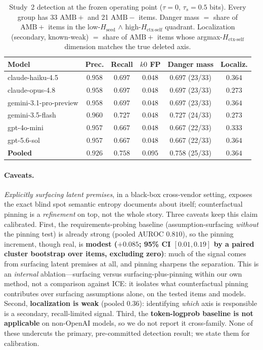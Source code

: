 \documentclass[acmsmall,screen,review,anonymous]{acmart}
\newcommand{\Hseed}{\ensuremath{H_{\mathrm{seed}}}}
\newcommand{\Hctx}{\ensuremath{H_{\text{ctx-self}}}}
\begin{document}
\begin{table}[t]
\centering
\caption{Study~2 detection at the frozen operating point ($\tau=0$, $\tau_s=0.5$ bits). Every group has
33 $\mathrm{AMB}{+}$ and 21 $\mathrm{AMB}{-}$ items. Danger mass $=$ share of $\mathrm{AMB}{+}$ items in the
low-\Hseed{} $\wedge$ high-\Hctx{} quadrant. Localization (secondary, known-weak) $=$ share of
$\mathrm{AMB}{+}$ items whose argmax-\Hctx{} dimension matches the true deleted axis.}
\label{tab:lps-op}
\footnotesize
\setlength{\tabcolsep}{4pt}
\begin{tabular}{@{}lccccc@{}}
\toprule
Model & Prec. & Recall & $k0$ FP & Danger mass & Localiz. \\
\midrule
claude-haiku-4.5 & $0.958$ & $0.697$ & $0.048$ & $0.697$ (23/33) & $0.364$ \\
claude-opus-4.8  & $0.958$ & $0.697$ & $0.048$ & $0.697$ (23/33) & $0.273$ \\
gemini-3.1-pro-preview & $0.958$ & $0.697$ & $0.048$ & $0.697$ (23/33) & $0.364$ \\
gemini-3.5-flash & $0.960$ & $0.727$ & $0.048$ & $0.727$ (24/33) & $0.273$ \\
gpt-4o-mini      & $0.957$ & $0.667$ & $0.048$ & $0.667$ (22/33) & $0.333$ \\
gpt-5.6-sol      & $0.957$ & $0.667$ & $0.048$ & $0.667$ (22/33) & $0.364$ \\
\midrule
\textbf{Pooled}  & $\mathbf{0.926}$ & $\mathbf{0.758}$ & $0.095$ & $\mathbf{0.758}$ (25/33) & $0.364$ \\
\bottomrule
\end{tabular}
\end{table}

\paragraph{Caveats.} \emph{Explicitly surfacing latent premises}, in
a black-box cross-vendor setting, exposes the exact blind spot semantic entropy documents about itself;
counterfactual pinning is a \emph{refinement} on top, not the whole story. Three caveats keep this claim
calibrated. First, the requirements-probing baseline (assumption-surfacing \emph{without} the pinning
test) is already strong (pooled AUROC $0.810$), so the pinning increment, though real, is
\textbf{modest ($+0.085$; 95\% CI $[0.01,0.19]$ by a paired cluster bootstrap over items, excluding zero)}: much of the signal comes from surfacing latent premises at all, and pinning
sharpens the separation. This is an \emph{internal} ablation---surfacing versus surfacing-plus-pinning within our own method, not a
comparison against ICE: it isolates what counterfactual pinning contributes over surfacing assumptions alone,
on the tested items and models. Second, \textbf{localization is weak} (pooled $0.36$): identifying \emph{which}
axis is responsible is a secondary, recall-limited signal. Third, the \textbf{token-logprob
baseline is not applicable} on non-OpenAI models, so we do not report it cross-family. None of these
undercuts the primary, pre-committed detection result; we state them for calibration.
\end{document}
